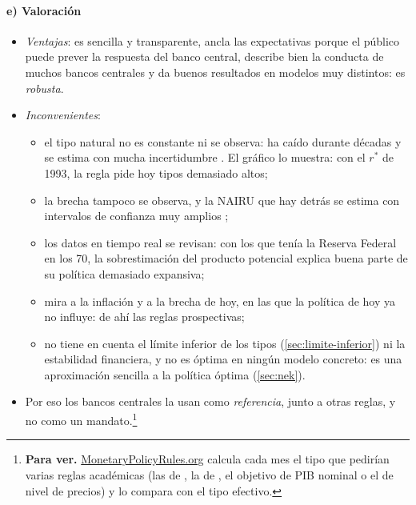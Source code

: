 \documentclass[11pt]{article}
\begin{document}
\paragraph{e) Valoración}

\begin{itemize}
\item \emph{Ventajas}: es sencilla y transparente, ancla las expectativas porque el público puede prever la respuesta del banco central, describe bien la conducta de muchos bancos centrales y da buenos resultados en modelos muy distintos: es \emph{robusta}.
\item \emph{Inconvenientes}:
  \begin{itemize}
  \item el tipo natural no es constante ni se observa: ha caído durante décadas y se estima con mucha incertidumbre\nocite{LaubachWilliams2003,HolstonLaubachWilliams2017Measuring} . El gráfico lo muestra: con el $r^*$ de 1993, la regla pide hoy tipos demasiado altos;
  \item la brecha tampoco se observa, y la NAIRU que hay detrás se estima con intervalos de confianza muy amplios\nocite{StaigerStockWatson1997NAIRU} ;
  \item los datos en tiempo real se revisan: con los que tenía la Reserva Federal en los 70, la sobrestimación del producto potencial explica buena parte de su política demasiado expansiva\nocite{Orphanides2001Monetary};
  \item mira a la inflación y a la brecha de hoy, en las que la política de hoy ya no influye: de ahí las reglas prospectivas;
  \item no tiene en cuenta el límite inferior de los tipos (\ref{sec:limite-inferior}) ni la estabilidad financiera, y no es óptima en ningún modelo concreto: es una aproximación sencilla a la política óptima (\ref{sec:nek}).
  \end{itemize}
\item Por eso los bancos centrales la usan como \emph{referencia}, junto a otras reglas, y no como un mandato\nocite{Fed2026Reglas}.\footnote{\textbf{Para ver.} \href{https://www.monetarypolicyrules.org/}{MonetaryPolicyRules.org} calcula cada mes el tipo que pedirían varias reglas académicas (las de , la de , el objetivo de PIB nominal o el de nivel de precios) y lo compara con el tipo efectivo.}
\end{itemize}

\end{document}
